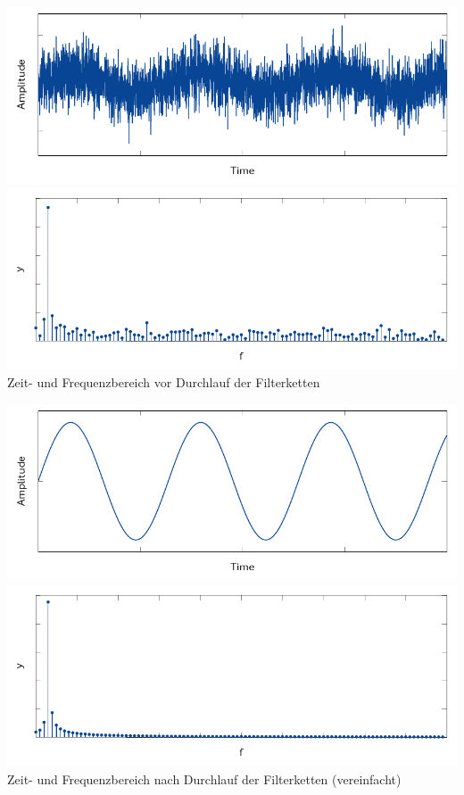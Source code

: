 {    \begin{minipage}{0.32\textwidth}
        \begin{center}
            \vspace{3ex}
            \includegraphics[width=\textwidth]{images/p6fhu-noisySine.pdf}
            \includegraphics[width=\textwidth]{images/p6fhu-noisySineFFT.pdf}
            \footnotesize{Zeit- und Frequenzbereich vor Durchlauf der Filterketten}
            \vspace{4ex}

            \includegraphics[width=\textwidth]{images/p6fhu-sine.pdf}
            \includegraphics[width=\textwidth]{images/p6fhu-sineFFT.pdf}
            \footnotesize{Zeit- und Frequenzbereich nach Durchlauf der Filterketten (vereinfacht)}
        \end{center}
    \end{minipage}

}
